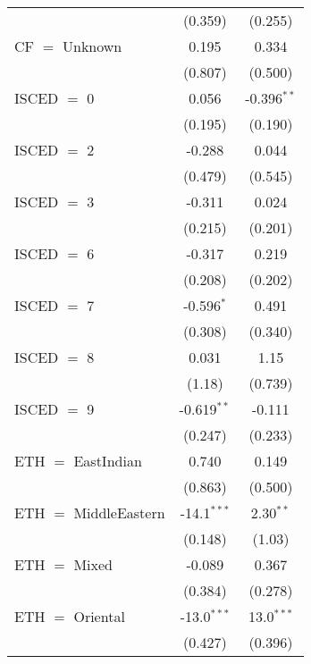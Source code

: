 \begin{table}[htbp!]
\begin{adjustbox}{width = 1\textwidth, max height = 0.95\textheight, center}
\begin{threeparttable}[b]
\begin{tabular}{lcc}
                                  & (0.359)       & (0.255)\\   
            CF $=$ Unknown        & 0.195         & 0.334\\   
                                  & (0.807)       & (0.500)\\   
            ISCED $=$ 0           & 0.056         & -0.396$^{**}$\\   
                                  & (0.195)       & (0.190)\\   
            ISCED $=$ 2           & -0.288        & 0.044\\   
                                  & (0.479)       & (0.545)\\   
            ISCED $=$ 3           & -0.311        & 0.024\\   
                                  & (0.215)       & (0.201)\\   
            ISCED $=$ 6           & -0.317        & 0.219\\   
                                  & (0.208)       & (0.202)\\   
            ISCED $=$ 7           & -0.596$^{*}$  & 0.491\\   
                                  & (0.308)       & (0.340)\\   
            ISCED $=$ 8           & 0.031         & 1.15\\   
                                  & (1.18)        & (0.739)\\   
            ISCED $=$ 9           & -0.619$^{**}$ & -0.111\\   
                                  & (0.247)       & (0.233)\\   
            ETH $=$ EastIndian    & 0.740         & 0.149\\   
                                  & (0.863)       & (0.500)\\   
            ETH $=$ MiddleEastern & -14.1$^{***}$ & 2.30$^{**}$\\   
                                  & (0.148)       & (1.03)\\   
            ETH $=$ Mixed         & -0.089        & 0.367\\   
                                  & (0.384)       & (0.278)\\   
            ETH $=$ Oriental      & -13.0$^{***}$ & 13.0$^{***}$\\   
                                  & (0.427)       & (0.396)\\   

\end{tabular}
\end{threeparttable}
\end{adjustbox}
\end{table}
